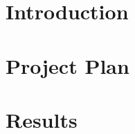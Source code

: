 \documentclass[a4paper,10pt]{article}
\begin{document}
\begin{titlepage}
\end{titlepage}

\thispagestyle{empty}
\begin{center}
    \begin{abstract}
    
    \end{abstract}
\end{center}
\clearpage
\newpage



\pagestyle{fancy}
\addtolength{\headheight}{\baselineskip}
\newcommand{\chaptermark}[1]{%
\markboth{#1}%
{}}
\lhead{}
\chead{}

\rhead{\nouppercase{{\sl \leftmark}} \hspace{0.5cm} \makebox[1cm][r]{%
\thepage}}

\cfoot{}


\tableofcontents
\newpage

\section{\label{sec:intro}Introduction}


\section{\label{sec:plan}Project Plan}


\section{\label{sec:results}Results} 


%



%
%
\end{document}
